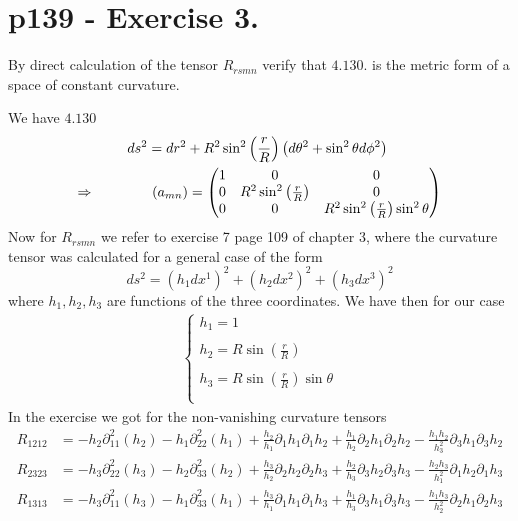 \section{p139 - Exercise 3.}
\begin{tcolorbox}
By direct calculation of the tensor $R_{rsmn}$ verify that $\mathbf{4.130.}$ is the metric form of a space of constant curvature.
\end{tcolorbox}
We have  $4.130$
\begin{align}
ds^2&= dr^2+R^2\sin^2\left(\frac{r}{R}\right)\left(d\theta^2+\sin^2\theta d\phi^2\right)\\
\Rightarrow\quad\quad\quad\quad &
\ (a_{mn}) = \begin{pmatrix}
 1& 0 & 0\\
0 & R^2\sin^2\left(\frac{r}{R}\right) & 0 \\
0 & 0 & R^2\sin^2\left(\frac{r}{R}\right)\sin^2\theta \\
\end{pmatrix}
\end{align}
Now for $R_{rsmn}$ we refer to exercise 7 page 109 of chapter 3, where the curvature tensor was calculated for a general case of the form 
$$ ds^2= (h_1dx^1)^2+(h_2dx^2)^2+(h_3dx^3)^2$$ where $h_1, h_2, h_3$ are functions of the three coordinates.
We have then for our case
\begin{align}
\left\{\begin{array}{l}
h_1 = 1\\\\
h_2 = R\sin\left(\frac{r}{R}\right)\\\\
h_3 = R\sin\left(\frac{r}{R}\right)\sin\theta\\\\
\end{array}\right.
\end{align}
In the exercise we got for the non-vanishing curvature tensors
\begin{align}
R_{1212}&=
-h_2\partial_{11}^2(h_2)-h_1\partial_{22}^2(h_1)
+\frac{h_2}{h_1}\partial_1 h_1\partial_1 h_2+\frac{h_1}{h_2}\partial_2 h_1\partial_2 h_2-\frac{h_1 h_2}{h_3^2}\partial_3 h_1\partial_3 h_2\\
R_{2323}&=
-h_3\partial_{22}^2(h_3)-h_2\partial_{33}^2(h_2)
+\frac{h_3}{h_2}\partial_2 h_2\partial_2 h_3+\frac{h_2}{h_3}\partial_3 h_2\partial_3 h_3-\frac{h_2 h_3}{h_1^2}\partial_1 h_2\partial_1 h_3\\
R_{1313}&=
-h_3\partial_{11}^2(h_3)-h_1\partial_{33}^2(h_1)
+\frac{h_3}{h_1}\partial_1 h_1\partial_1 h_3+\frac{h_1}{h_3}\partial_3 h_1\partial_3 h_3-\frac{h_1 h_3}{h_2^2}\partial_2 h_1\partial_2 h_3
\end{align}
